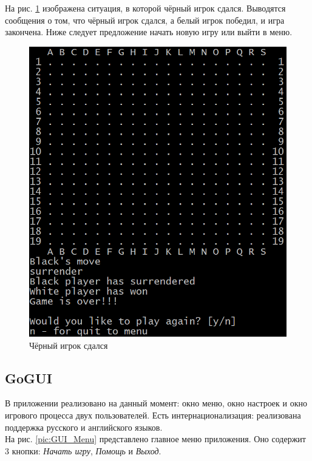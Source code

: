 На рис. \ref{pic:CUI_Surrender} изображена ситуация, в которой чёрный игрок сдался. Выводятся сообщения о том, что чёрный игрок сдался, а белый игрок победил, и игра закончена. Ниже следует предложение начать новую игру или выйти в меню.

\begin{figure}[H]
	\begin{center}
		\includegraphics[scale=0.6]{pics/GoCUI/Surrender.png}
	    \caption{Чёрный игрок сдался} 
		\label{pic:CUI_Surrender}
	\end{center}
\end{figure}

\subsection*{GoGUI}

В приложении реализовано на данный момент: окно меню, окно настроек и окно игрового процесса двух пользователей. Есть интернационализация: реализована поддержка русского и английского языков.\\

На рис. \ref{pic:GUI_Menu} представлено главное меню приложения. Оно содержит 3 кнопки: \textit{Начать игру}, \textit{Помощь} и \textit{Выход}.

